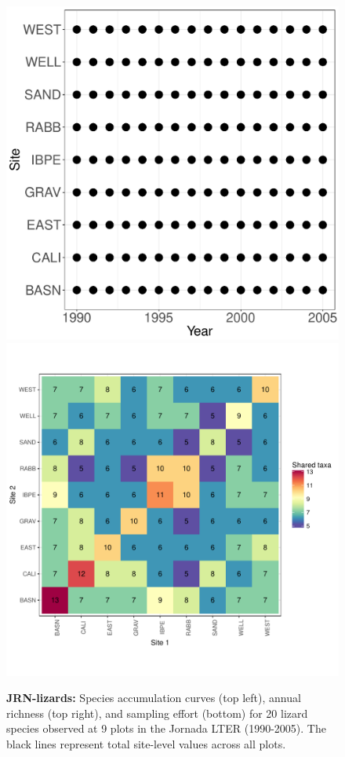 \documentclass[11pt, oneside]{article}
\begin{document}
\begin{figure}[h!]
\includegraphics[scale = 0.4]{jrn-lizards-hope_spatiotemporal_sampling_effort.pdf}
\includegraphics[scale = 0.4]{jrn-lizards-hope_spp_shared.pdf}
\caption{{\bf JRN-lizards:} Species accumulation curves (top left),  annual richness (top right), and sampling effort (bottom)  for 20 lizard species observed at 9 plots in the Jornada LTER (1990-2005). The black lines represent total site-level values across all plots.}
\label{jrn-lizards}
\end{figure}
\end{document}
